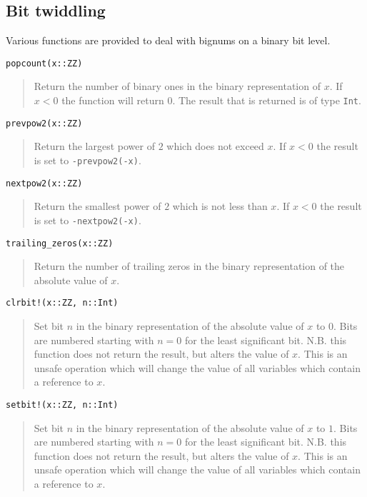 \documentclass[a4paper,10pt]{article}
\newcommand{\code}{\lstinline}
\newcommand{\desc}[1]{\vspace{-3mm}\begin{quote}#1\end{quote}}
\begin{document}
{{{\subsection{Bit twiddling}

Various functions are provided to deal with bignums on a binary bit level.

\begin{lstlisting}
popcount(x::ZZ)
\end{lstlisting}

\desc{Return the number of binary ones in the binary representation of $x$. If $x < 0$ the
function will return $0$. The result that is returned is of type \code{Int}.}

\begin{lstlisting}
prevpow2(x::ZZ)
\end{lstlisting}

\desc{Return the largest power of $2$ which does not exceed $x$. If $x < 0$ the result is
set to \code{-prevpow2(-x)}.}

\begin{lstlisting}
nextpow2(x::ZZ)
\end{lstlisting}

\desc{Return the smallest power of $2$ which is not less than $x$. If $x < 0$ the result is
set to \code{-nextpow2(-x)}.}

\begin{lstlisting}
trailing_zeros(x::ZZ)
\end{lstlisting}

\desc{Return the number of trailing zeros in the binary representation of the absolute
value of $x$.}

\begin{lstlisting}
clrbit!(x::ZZ, n::Int)
\end{lstlisting}

\desc{Set bit $n$ in the binary representation of the absolute value of $x$ to $0$. Bits
are numbered starting with $n = 0$ for the least significant bit. N.B. this function does
not return the result, but alters the value of $x$. This is an unsafe operation which will
change the value of all variables which contain a reference to $x$.}

\begin{lstlisting}
setbit!(x::ZZ, n::Int)
\end{lstlisting}

\desc{Set bit $n$ in the binary representation of the absolute value of $x$ to $1$. Bits
are numbered starting with $n = 0$ for the least significant bit. N.B. this function does
not return the result, but alters the value of $x$. This is an unsafe operation which will
change the value of all variables which contain a reference to $x$.}

}}}
\end{document}
